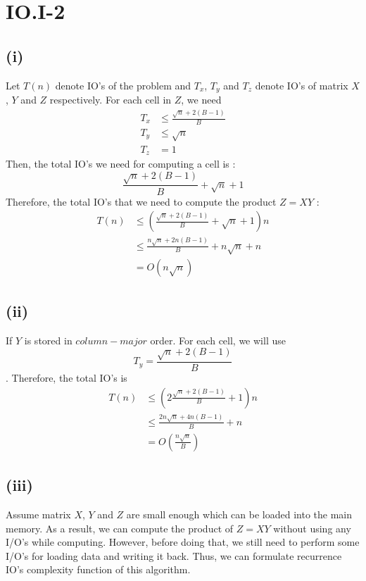 \section*{IO.I-2}
\subsection*{(i)}
Let $T(n)$ denote IO's of the problem and $T_x$, $T_y$ and $T_z$ denote IO's of matrix $X$, $Y$ and $Z$ respectively.
For each cell in $Z$, we need
\begin{align*}
	T_x &\leq \frac{\sqrt{n}+2(B-1)}{B}\\
	T_y &\leq \sqrt{n} \\
	T_z &= 1
\end{align*}
Then, the total IO's we need for computing a cell is :
$$\frac{\sqrt{n}+2(B-1)}{B} + \sqrt{n} + 1$$
Therefore, the total IO's that we need to compute the product $Z=XY$ :
\begin{align*}
	T(n) &\leq ( \frac{\sqrt{n}+2(B-1)}{B} + \sqrt{n} + 1	)n\\
	&\leq \frac{n\sqrt{n}+2n(B-1)}{B} + n\sqrt{n} + n \\
	&= O(n\sqrt{n})
\end{align*}

\subsection*{(ii)}
If $Y$ is stored in $column-major$ order. For each cell, we will use $$T_y=\frac{\sqrt{n}+2(B-1)}{B}$$.
Therefore, the total IO's is
\begin{align*}
	T(n) &\leq ( 2\frac{\sqrt{n}+2(B-1)}{B} + 1	)n\\
	&\leq \frac{2n\sqrt{n}+4n(B-1)}{B} + n \\
	&= O(\frac{n\sqrt{n}}{B})
\end{align*}

\subsection*{(iii)}

Assume matrix $X$, $Y$ and $Z$ are small enough which can be loaded into the main memory. As a result, we can compute the product of $Z=XY$ without using any I/O's while computing. However, before doing that, we still need to perform some I/O's for loading  data and writing it back. Thus, we can formulate recurrence IO's complexity function of this algorithm.

